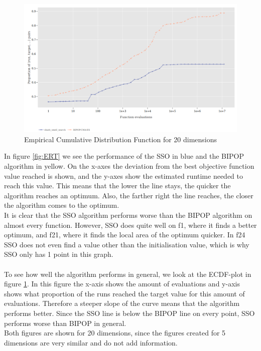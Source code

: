 \documentclass[runningheads]{llncs}
\begin{document}
\begin{figure}[h]
    \centering
    \includegraphics[scale = 0.4]{D20-ECDF.png}
    \caption{Empirical Cumulative Distribution Function for 20 dimensions}
    \label{fig:ECDF}
\end{figure}

In figure \ref{fig:ERT} we see the performance of the SSO in blue and the BIPOP algorithm in yellow. On the x-axes the deviation from the best objective function value reached is shown, and the y-axes show the estimated runtime needed to reach this value. This means that the lower the line stays, the quicker the algorithm reaches an optimum. Also, the farther right the line reaches, the closer the algorithm comes to the optimum.\\
It is clear that the SSO algorithm performs worse than the BIPOP algorithm on almost every function. However, SSO does quite well on f1, where it finds a better optimum, and f21, where it finds the local area of the optimum quicker. In f24 SSO does not even find a value other than the initialisation value, which is why SSO only has 1 point in this graph.\\
\\
To see how well the algorithm performs in general, we look at the ECDF-plot in figure \ref{fig:ECDF}. In this figure the x-axis shows the amount of evaluations and y-axis shows what proportion of the runs reached the target value for this amount of evaluations.
Therefore a steeper slope of the curve means that the algorithm performs better. Since the SSO line is below the BIPOP line on every point, SSO performs worse than BIPOP in general.\\
Both figures are shown for 20 dimensions, since the figures created for 5 dimensions are very similar and do not add information. \\
\end{document}
